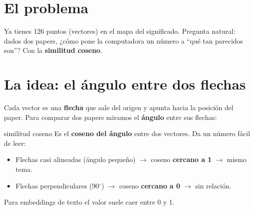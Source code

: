 \documentclass[11pt,a4paper]{article}
\begin{document}

\section{El problema}

Ya tienes 126 puntos (vectores) en el mapa del significado. Pregunta natural: dados dos
papers, ¿cómo pone la computadora un número a ``qué tan parecidos son''? Con la
\textbf{similitud coseno}.

\section{La idea: el ángulo entre dos flechas}

Cada vector es una \textbf{flecha} que sale del origen y apunta hacia la posición del paper.
Para comparar dos papers miramos el \textbf{ángulo} entre sus flechas:

\begin{center}
\end{center}

\begin{concepto}{similitud coseno}
Es el \textbf{coseno del ángulo} entre dos vectores. Da un número fácil de leer:
\begin{itemize}
  \item Flechas casi alineadas (ángulo pequeño) $\rightarrow$ coseno \textbf{cercano a 1}
        $\rightarrow$ mismo tema.
  \item Flechas perpendiculares (90$^\circ$) $\rightarrow$ coseno \textbf{cercano a 0}
        $\rightarrow$ sin relación.
\end{itemize}
Para embeddings de texto el valor suele caer entre 0 y 1.
\end{concepto}
\end{document}
